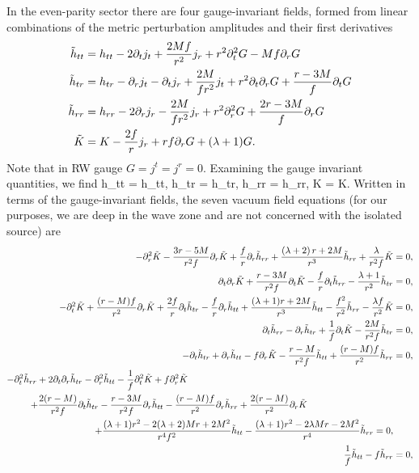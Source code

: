 \documentclass{article}
\begin{document}
In the even-parity sector there are four gauge-invariant fields, formed 
from linear combinations of the metric perturbation amplitudes and their first derivatives
\cite{MP_2005}
\begin{align}
\begin{split}
\tilde h_{tt} &= h_{tt} - 2 \partial_{t} j_{t} 
+ \frac{2M f}{r^{2}} j_{r} 
+ r^{2} \partial_{t}^{2} G 
- M f \partial_{r} G \\
\tilde h_{tr} &= h_{tr} 
- \partial_{r} j_{t} 
- \partial_{t} j_{r} 
+ \frac{2M }{ f r^{2}} j_{t} 
+ r^{2} \partial_{t} \partial_{r} G 
+ \frac{r - 3M}{f} \partial_{t} G \\
\tilde h_{rr} &= h_{rr} 
- 2 \partial_{r} j_{r} 
- \frac{2M}{f r^{2}} j_{r} 
+ r^{2} \partial_{r}^{2} G 
+ \frac{2r - 3M}{f} \partial_{r} G \\
\tilde K &= K - \frac{2f}{r} j_{r} + rf \partial_{r} G + (\lambda+1) G .
\end{split}
\end{align}
Note that in RW gauge $G = j^{t} = j^{r} = 0$.  Examining the gauge 
invariant quantities, we find
\be
\tilde h_{tt} = h_{tt}, 
\q \q \tilde h_{tr} = h_{tr},
\q \q \tilde h_{rr} = h_{rr},
\q \q \tilde K = K.
\ee
Written in terms of the gauge-invariant fields, 
the seven vacuum field equations 
(for our purposes, we are deep in the wave zone and 
are not concerned with the isolated source) are
\begin{align}
- \pa_r^2  \tilde K - \frac{3r - 5M}{r^2 f} \pa_r  \tilde K 
+ \frac{f}{r} \pa_r  \tilde h_{rr}
+\frac{\l \la + 2 \r r + 2M}{r^3}  \tilde h_{rr} + \frac{\la}{ r^2 f}  \tilde K 
&= 0, \\
\label{eq:evenEq2}
 \pa_t \pa_r  \tilde K 
+ \frac{r - 3M}{r^2 f} \pa_t  \tilde K - \frac{f}{r} \pa_t  \tilde h_{rr} 
- \frac{\la + 1}{ r^2}  \tilde h_{tr} &= 0, \\
 - \pa_t^2  \tilde K 
+ \frac{(r-M)f}{r^2} \pa_r  \tilde K 
+ \frac{2f}{r} \pa_t  \tilde h_{tr} 
- \frac{f}{r} \pa_r  \tilde h_{tt} 
+ \frac{(\la + 1)r + 2M}{r^3}  \tilde h_{tt} 
- \frac{f^2}{r^2}  \tilde h_{rr} 
- \frac{\la f}{r^2}  \tilde K &= 0, \\
\pa_t  \tilde h_{rr} - \pa_r  \tilde h_{tr} 
+ \frac{1}{f} \pa_t  \tilde K - \frac{2M}{r^2 f}  \tilde h_{tr} &= 0, \\
-\pa_t  \tilde h_{tr} 
+ \pa_r  \tilde h_{tt} - f \pa_r  \tilde K - \frac{r - M}{r^2 f}  \tilde h_{tt} 
+ \frac{(r-M) f}{r^2}  \tilde h_{rr} &= 0, \\
\begin{split}
-\pa_t^2  \tilde h_{rr} 
+ 2 \pa_t \pa_r  \tilde h_{tr} - \pa_r^2  \tilde h_{tt} 
- \frac{1}{f} \pa_t^2  \tilde K + f \pa_r^2  \tilde K  \hspace{7cm}& \\
+ \frac{2 (r - M) }{r^2 f} \pa_t  \tilde h_{tr}
- \frac{r - 3M}{r^2 f} \pa_r  \tilde h_{tt}  
- \frac{(r-M) f}{r^2} \pa_r  \tilde h_{rr} 
 + \frac{2(r-M)}{r^2} \pa_r  \tilde K \hspace{2.5cm} & \\
+ \frac{( \la +1) r^2 - 2(\la + 2) M r + 2M^2}{r^4 f^2}  \tilde h_{tt}
- \frac{(\la+1) r^2 - 2\la M r - 2 M^2}{r^4}  \tilde h_{rr} &= 0,
\end{split} \\
\frac{1}{f}  \tilde h_{tt} - f  \tilde h_{rr} &= 0 ,
\end{align}
\end{document}
